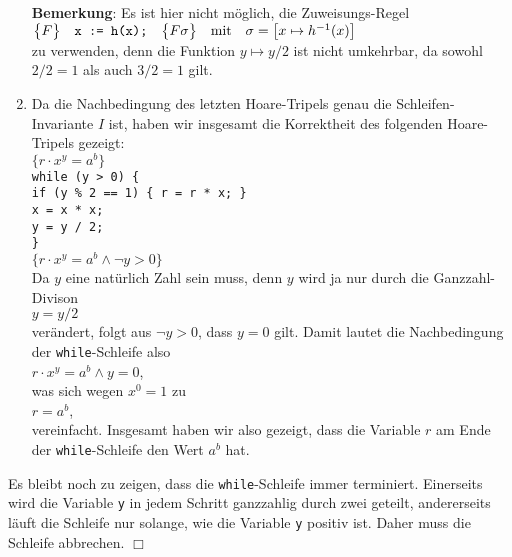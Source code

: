 \begin{enumerate}
      \textbf{Bemerkung}:  Es ist hier nicht m\"oglich, die Zuweisungs-Regel
      \\[0.2cm]
      \hspace*{1.3cm}
      $\bigl\{F\bigr\}\quad\texttt{x := h(x);}\quad\bigl\{F\sigma\bigr\} \quad \mathrm{mit} \quad \sigma = \bigl[x \mapsto h^{-1}(x)\bigr]$
      \\[0.2cm]
      zu verwenden, denn die Funktion $y \mapsto y/2$ ist nicht umkehrbar, da
      sowohl $2/2 = 1$ als auch $3/2 = 1$ gilt.
\item Da  die Nachbedingung des letzten Hoare-Tripels  genau die Schleifen-Invariante $I$
      ist, haben wir insgesamt die Korrektheit des  folgenden Hoare-Tripels gezeigt: 
      \\[0.2cm]
      \hspace*{1.3cm} $\{ r \cdot x^y = a^b \}$                  \\[0.2cm]
      \hspace*{2.3cm} \texttt{while (y > 0) \{}                  \\
      \hspace*{2.8cm} \texttt{if (y \% 2 == 1) \{ r = r * x; \}}  \\
      \hspace*{2.8cm} \texttt{x = x * x;}                        \\
      \hspace*{2.8cm} \texttt{y = y / 2;}                        \\
      \hspace*{2.3cm} \texttt{\}}                                \\
      \hspace*{1.3cm} $\{ r \cdot x^y = a^b \wedge \neg y > 0\}$ \\[0.2cm]
      Da $y$ eine nat\"urlich Zahl sein muss, denn $y$ wird ja nur durch die
      Ganzzahl-Divison 
      \\[0.2cm]
      \hspace*{1.3cm}
      $y = y / 2$
      \\[0.2cm]
      ver\"andert, folgt aus $\neg y > 0$, dass $y = 0$ gilt.  Damit lautet die Nachbedingung der
      \texttt{while}-Schleife also 
      \\[0.2cm]
      \hspace*{1.3cm} $r \cdot x^y = a^b \wedge y = 0$,
      \\[0.2cm]
      was sich wegen $x^0 = 1$ zu 
      \\[0.2cm]
      \hspace*{1.3cm}
      $r = a^b$,
      \\[0.2cm]
      vereinfacht.  Insgesamt haben wir also gezeigt, dass die Variable $r$ am Ende der
      \texttt{while}-Schleife den Wert $a^b$ hat.  
\end{enumerate}
Es bleibt noch zu zeigen, dass die \texttt{while}-Schleife immer terminiert.
Einerseits wird die Variable \texttt{y}  in jedem Schritt ganzzahlig durch zwei geteilt, andererseits
l\"auft die Schleife nur solange, wie die Variable \texttt{y} positiv ist.  Daher muss die
Schleife abbrechen.
\hspace*{\fill} $\Box$

